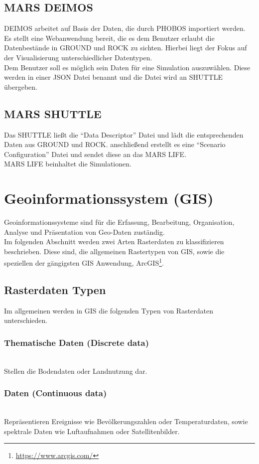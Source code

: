 \documentclass[10pt,conference,compsocconf]{IEEEtran}
\begin{document}
\subsection{MARS DEIMOS}
DEIMOS arbeitet auf Basis der Daten, die durch PHOBOS importiert werden. Es stellt eine Webanwendung bereit, die es dem Benutzer erlaubt die Datenbestände in GROUND und ROCK zu sichten. Hierbei liegt der Fokus auf der Visualisierung unterschiedlicher Datentypen.\\
Dem Benutzer soll es möglich sein Daten für eine Simulation auszuwählen. Diese werden in einer JSON Datei benannt und die Datei wird an SHUTTLE übergeben.

\subsection{MARS SHUTTLE}
Das SHUTTLE ließt die \enquote{Data Descriptor} Datei und lädt die entsprechenden Daten aus GROUND und ROCK. anschließend erstellt es eine \enquote{Scenario Configuration} Datei und sendet diese an das MARS LIFE.\\
MARS LIFE beinhaltet die Simulationen.


\section{Geoinformationssystem (GIS)}
Geoinformationssysteme sind für die Erfassung, Bearbeitung, Organisation, Analyse und Präsentation von Geo-Daten zuständig.\\
Im folgenden Abschnitt werden zwei Arten Rasterdaten zu klassifizieren beschrieben. Diese sind, die allgemeinen Rastertypen von GIS, sowie die speziellen der gängigsten GIS Anwendung, ArcGIS\footnote{\url{https://www.arcgis.com/}}.

\subsection{Rasterdaten Typen}
Im allgemeinen werden in GIS die folgenden Typen von Rasterdaten unterschieden.

\subsubsection{Thematische Daten (Discrete data)}\hspace*{\fill} \\
Stellen die Bodendaten oder Landnutzung dar.

\subsubsection{Daten (Continuous data)}\hspace*{\fill} \\
Repräsentieren Ereignisse wie Bevölkerungszahlen oder Temperaturdaten, sowie spektrale Daten wie Luftaufnahmen oder Satellitenbilder.
\end{document}
